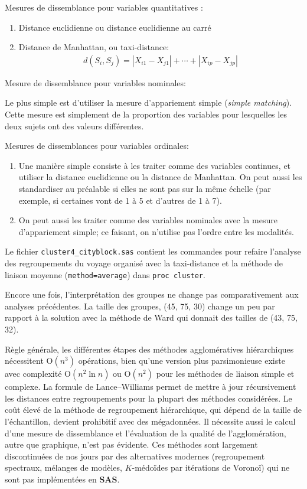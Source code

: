 \documentclass[
  11pt,
  letterpaper,
]{book}
\providecommand{\tightlist}{%
  \setlength{\itemsep}{0pt}\setlength{\parskip}{0pt}}
\theoremstyle{definition}
\theoremstyle{definition}
\theoremstyle{definition}
\theoremstyle{definition}
\theoremstyle{remark}
\begin{document}
Mesures de dissemblance pour variables quantitatives :

\begin{enumerate}
\def\labelenumi{\arabic{enumi})}
\tightlist
\item
  Distance euclidienne ou distance euclidienne au carré
\item
  Distance de Manhattan, ou taxi-distance:
  \begin{align*}
  d(S_i, S_j) = |X_{i1}-X_{j1}| + \cdots + |X_{ip}- X_{jp}|
  \end{align*}
\end{enumerate}

Mesure de dissemblance pour variables nominales:

Le plus simple est d'utiliser la mesure d'appariement simple (\emph{simple matching}). Cette mesure est simplement de la proportion des variables pour lesquelles les deux sujets ont des valeurs différentes.

Mesures de dissemblances pour variables ordinales:

\begin{enumerate}
\def\labelenumi{\arabic{enumi})}
\tightlist
\item
  Une manière simple consiste à les traiter comme des variables continues, et utiliser la distance euclidienne ou la distance de Manhattan. On peut aussi les standardiser au préalable si elles ne sont pas sur la même échelle (par exemple, si certaines vont de 1 à 5 et d'autres de 1 à 7).
\item
  On peut aussi les traiter comme des variables nominales avec la mesure d'appariement simple; ce faisant, on n'utilise pas l'ordre entre les modalités.
\end{enumerate}

Le fichier \texttt{cluster4\_cityblock.sas} contient les commandes pour refaire l'analyse des regroupements du voyage organisé avec la taxi-distance et la méthode de liaison moyenne (\texttt{method=average}) dans \texttt{proc\ cluster}.

Encore une fois, l'interprétation des groupes ne change pas comparativement aux analyses précédentes. La taille des groupes, (45, 75, 30) change un peu par rapport à la solution avec la méthode de Ward qui donnait des tailles de (43, 75, 32).

Règle générale, les différentes étapes des méthodes agglomératives hiérarchiques nécessitent \(\mathrm{O}(n^3)\) opérations, bien qu'une version plus parsimonieuse existe avec complexité \(\mathrm{O}(n^2\ln n)\) ou \(\mathrm{O}(n^2)\) pour les méthodes de liaison simple et complexe. La formule de Lance--Williams permet de mettre à jour récursivement les distances entre regroupements pour la plupart des méthodes considérées. Le coût élevé de la méthode de regroupement hiérarchique, qui dépend de la taille de l'échantillon, devient prohibitif avec des mégadonnées. Il nécessite aussi le calcul d'une mesure de dissemblance et l'évaluation de la qualité de l'agglomération, autre que graphique, n'est pas évidente. Ces méthodes sont largement discontinuées de nos jours par des alternatives modernes (regroupement spectraux, mélanges de modèles, \(K\)-médoïdes par itérations de Voronoï) qui ne sont pas implémentées en \textbf{SAS}.
\end{document}

